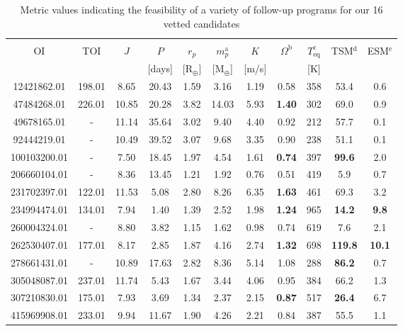 \clearpage
\begin{landscape}
\begin{table*}
  \small
  \renewcommand{\arraystretch}{0.7}
  \caption{Metric values indicating the feasibility of a variety of follow-up programs for our 16 vetted candidates}
  \label{oriontable:followup}
  \begin{tabular}{ccccccccccc}
    \hline \\ [-1ex]
    OI & TOI & $J$ & $P$ & $r_p$ & $m_p^{\text{a}}$ & $K$ & $\Omega^{\text{b}}$ & $T_{\text{eq}}^{\text{c}}$ & TSM$^{\text{d}}$ & ESM$^{\text{e}}$ \\ 
    &  &  & [days] & [R$_{\oplus}$] & [M$_{\oplus}$] & [m/s] &  & [K] &  & \\
    \hline
    12421862.01 & 198.01 & 8.65 & 20.43 & 1.59 & 3.16 & 1.19 & 0.58 & 358 & 53.4 & 0.6 \\ 
    47484268.01 & 226.01 & 10.85 & 20.28 & 3.82 & 14.03 & 5.93 & \textbf{1.40} & 302 & 69.0 & 0.9 \\ 
    49678165.01 & - & 11.14 & 35.64 & 3.02 & 9.40 & 4.40 & 0.92 & 212 & 57.7 & 0.1 \\ 
    92444219.01 & - & 10.49 & 39.52 & 3.07 & 9.68 & 3.35 & 0.90 & 238 & 51.1 & 0.1 \\ 
    100103200.01 & - & 7.50 & 18.45 & 1.97 & 4.54 & 1.61 & \textbf{0.74} & 397 & \textbf{99.6} & 2.0 \\ 
    206660104.01 & - & 8.36 & 13.45 & 1.21 & 1.92 & 0.76 & 0.51 & 419 & 5.9 & 0.7 \\ 
    231702397.01 & 122.01 & 11.53 & 5.08 & 2.80 & 8.26 & 6.35 & \textbf{1.63} & 461 & 69.3 & 3.2 \\ 
    234994474.01 & 134.01 & 7.94 & 1.40 & 1.39 & 2.52 & 1.98 & \textbf{1.24} & 965 & \textbf{14.2} & \textbf{9.8} \\ 
    260004324.01 & - & 8.80 & 3.82 & 1.15 & 1.62 & 0.98 & 0.74 & 619 & 7.6 & 2.1 \\ 
    262530407.01 & 177.01 & 8.17 & 2.85 & 1.87 & 4.16 & 2.74 & \textbf{1.32} & 698 & \textbf{119.8} & \textbf{10.1} \\ 
    278661431.01 & - & 10.89 & 17.63 & 2.82 & 8.36 & 5.14 & 1.08 & 288 & \textbf{86.2} & 0.7 \\ 
    305048087.01 & 237.01 & 11.74 & 5.43 & 1.67 & 3.44 & 4.06 & 0.95 & 384 & 66.2 & 1.3 \\ 
    307210830.01 & 175.01 & 7.93 & 3.69 & 1.34 & 2.37 & 2.15 & \textbf{0.87} & 517 & \textbf{26.4} & 6.7 \\ 
    415969908.01 & 233.01 & 9.94 & 11.67 & 1.90 & 4.26 & 2.21 & 0.84 & 387 & 55.5 & 1.1 \\ 

\end{tabular}
\end{table*}
\end{landscape}
